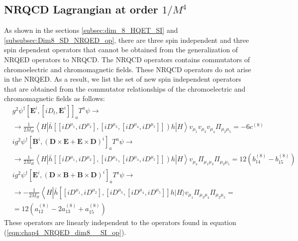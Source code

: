 \subsection{NRQCD Lagrangian at order $1/M^4$}\label{subsec:NRQCD_only_operators}
As shown in the sections \ref{subsec:dim_8_HQET_SI} and \ref{subsubsec:Dim8_SD_NRQED_op}, there are three spin independent and three spin dependent operators that cannot be obtained from the generalization of NRQED operators to NRQCD. The NRQCD operators contains commutators of chromoelectric and chromomagnetic fields. These NRQCD operators do not arise in the NRQED. As a result, we list the set of new spin independent operators that are obtained from the commutator relationships of the chromoelectric and chromomagnetic fields as follows:
\vspace{-0.7cm}
\begin{align}
&g^{2} \psi^{\dagger}\left[\bm{E}^{i},\left[i D_{t}, \bm{E}^{i}\right]\right]_{a} T^{a} \psi \rightarrow\nonumber \\
&\rightarrow \frac{1}{2 M_{H}}\left\langle H\left|\bar{h}\left[\left[i D^{\mu_{1}}, i D^{\mu_{2}}\right],\left[i D^{\mu_{3}},\left[i D^{\mu_{4}}, i D^{\mu_{5}}\right]\right]\right) h\right| H\right\rangle v_{\mu_{1}} v_{\mu_{3}} v_{\mu_{4}} \Pi_{\mu_{2} \mu_{5}}=-6 c^{(8)}\nonumber \\
&i g^{2} \psi^{\dagger}\left[\bm{B}^{i},(\bm{D} \times \bm{E}+\bm{E} \times \bm{D})^{i}\right]_{a} T^{a} \psi \rightarrow\nonumber\\
&\rightarrow \frac{1}{2 M_{H}}\left\langle H\left|\bar{h}\left[\left[i D^{\mu_{1}}, i D^{\mu_{2}}\right],\left[i D^{\mu_{3}},\left[i D^{\mu_{4}}, i D^{\mu_{5}}\right]\right]\right) h\right| H\right\rangle v_{\mu_{4}} \Pi_{\mu_{1} \mu_{3}} \Pi_{\mu_{2} \mu_{5}}=12\left(b_{14}^{(8)}-b_{15}^{(8)}\right)\nonumber \\
&i g^{2} \psi^{\dagger}\left[\bm{E}^{i},(\bm{D} \times \bm{B}+\bm{B} \times \bm{D})^{i}\right]_{a} T^{a} \psi \rightarrow\nonumber \\
&\rightarrow-\frac{1}{2 M_{H}}\left\langle H\left|\bar{h}\left[\left[i D^{\mu_{1}}, i D^{\mu_{2}}\right],\left[i D^{\mu_{3}},\left[i D^{\mu_{4}}, i D^{\mu_{5}}\right]\right] h|H\rangle v_{\mu_{1}} \Pi_{\mu_{3} \mu_{4}} \Pi_{\mu_{2} \mu_{5}}=\right.\right.\right.\nonumber \\
&=12\left(a_{12}^{(8)}-2 a_{13}^{(8)}+a_{15}^{(8)}\right)
\end{align}
These operators are linearly independent to the operators found in equation (\ref{eqn:chap4_NRQED_dim8__SI_op}).\par 
